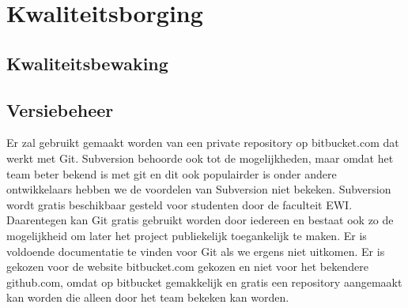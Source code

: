 \section{Kwaliteitsborging}
\subsection{Kwaliteitsbewaking}
\subsection{Versiebeheer}
Er zal gebruikt gemaakt worden van een private repository op bitbucket.com dat werkt met Git. Subversion behoorde ook tot de mogelijkheden, maar omdat het team beter bekend is met git en dit ook populairder is onder andere ontwikkelaars hebben we de voordelen van Subversion niet bekeken. Subversion wordt gratis beschikbaar gesteld voor studenten door de faculteit EWI. Daarentegen kan Git gratis gebruikt worden door iedereen en bestaat ook zo de mogelijkheid om later het project publiekelijk toegankelijk te maken. Er is voldoende documentatie te vinden voor Git als we ergens niet uitkomen. Er is gekozen voor de website bitbucket.com gekozen en niet voor het bekendere github.com, omdat op bitbucket gemakkelijk en gratis een repository aangemaakt kan worden die alleen door het team bekeken kan worden. 
